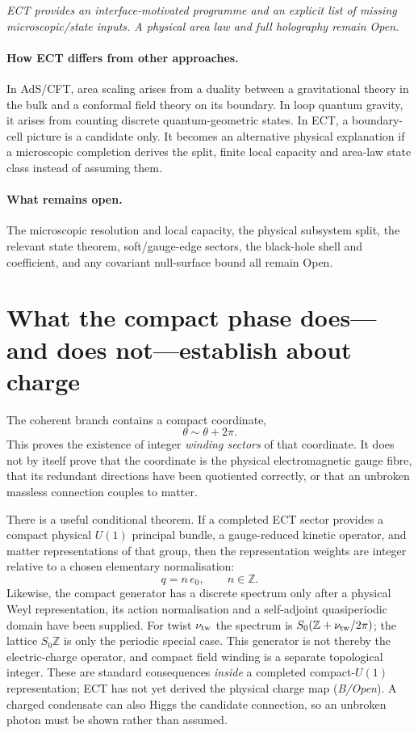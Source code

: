 \documentclass[11pt,a4paper]{article}
\begin{document}
\emph{ECT provides an interface-motivated programme and an explicit
list of missing microscopic/state inputs.  A physical area law and
full holography remain Open.}

\paragraph{How ECT differs from other approaches.}
In AdS/CFT, area scaling arises from a duality between a
gravitational theory in the bulk and a conformal field theory on
its boundary.
In loop quantum gravity, it arises from counting discrete
quantum-geometric states.
In ECT, a boundary-cell picture is a candidate only.  It becomes an
alternative physical explanation if a microscopic completion derives
the split, finite local capacity and area-law state class instead of
assuming them.

\paragraph{What remains open.}
The microscopic resolution and local capacity, the physical subsystem
split, the relevant state theorem, soft/gauge-edge sectors, the
black-hole shell and coefficient, and any covariant null-surface bound
all remain Open.


\section{What the compact phase does---and does not---establish about charge}
\label{sec:pop_charge}

The coherent branch contains a compact coordinate,
\[
\theta \sim \theta + 2\pi.
\]
This proves the existence of integer \emph{winding sectors} of that
coordinate.  It does not by itself prove that the coordinate is the
physical electromagnetic gauge fibre, that its redundant directions
have been quotiented correctly, or that an unbroken massless connection
couples to matter.

There is a useful conditional theorem.  If a completed ECT sector
provides a compact physical $U(1)$ principal bundle, a gauge-reduced
kinetic operator, and matter representations of that group, then the
representation weights are integer relative to a chosen elementary
normalisation:
\[
q = n\,e_0, \qquad n\in\mathbb{Z}.
\]
Likewise, the compact generator has a discrete spectrum only after a
physical Weyl representation, its action normalisation and a
self-adjoint quasiperiodic domain have been supplied.  For twist
$\nu_{\rm tw}$ the spectrum is
$S_0(\mathbb Z+\nu_{\rm tw}/2\pi)$; the lattice $S_0\mathbb Z$ is
only the periodic special case.  This generator is not thereby the
electric-charge operator, and compact field winding is a separate
topological integer.  These are standard consequences \emph{inside} a
completed compact-$U(1)$ representation; ECT has not yet derived the
physical charge map (\emph{B/Open}).  A charged condensate can also
Higgs the candidate connection, so an unbroken photon must be shown
rather than assumed.
\end{document}
